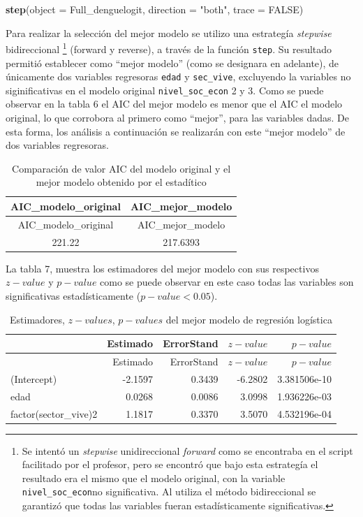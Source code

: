 \documentclass[
]{article}
\newenvironment{Shaded}{\begin{snugshade}}{\end{snugshade}}
\newcommand{\DataTypeTok}[1]{\textcolor[rgb]{0.13,0.29,0.53}{#1}}
\newcommand{\KeywordTok}[1]{\textcolor[rgb]{0.13,0.29,0.53}{\textbf{#1}}}
\newcommand{\NormalTok}[1]{#1}
\newcommand{\OtherTok}[1]{\textcolor[rgb]{0.56,0.35,0.01}{#1}}
\newcommand{\StringTok}[1]{\textcolor[rgb]{0.31,0.60,0.02}{#1}}
\begin{document}
\begin{Shaded}
\begin{Highlighting}[]
\KeywordTok{step}\NormalTok{(}\DataTypeTok{object =}\NormalTok{ Full_denguelogit, }\DataTypeTok{direction =} \StringTok{"both"}\NormalTok{, }\DataTypeTok{trace =} \OtherTok{FALSE}\NormalTok{)}
\end{Highlighting}
\end{Shaded}

Para realizar la selección del mejor modelo se utilizo una estrategía
\emph{stepwise} bidireccional \footnote{Se intentó un \emph{stepwise}
  unidireccional \emph{forward} como se encontraba en el script
  facilitado por el profesor, pero se encontró que bajo esta estrategía
  el resultado era el mismo que el modelo original, con la variable
  \texttt{nivel\_soc\_econ}no significativa. Al utiliza el método
  bidireccional se garantizó que todas las variables fueran
  estadísticamente significativas.} (forward y reverse), a través de la
función \texttt{step}. Su resultado permitió establecer como ``mejor
modelo'' (como se designara en adelante), de únicamente dos variables
regresoras \texttt{edad} y \texttt{sec\_vive}, excluyendo la variables
no siginificativas en el modelo original \texttt{nivel\_soc\_econ} 2 y
3. Como se puede observar en la tabla 6 el AIC del mejor modelo es menor
que el AIC el modelo original, lo que corrobora al primero como
``mejor'', para las variables dadas. De esta forma, los análisis a
continuación se realizarán con este ``mejor modelo'' de dos variables
regresoras.

\begin{longtable}[]{@{}cc@{}}
\caption{Comparación de valor AIC del modelo original y el mejor modelo
obtenido por el estadítico}\tabularnewline
\toprule
AIC\_modelo\_original & AIC\_mejor\_modelo\tabularnewline
\midrule
\endfirsthead
\toprule
AIC\_modelo\_original & AIC\_mejor\_modelo\tabularnewline
\midrule
\endhead
221.22 & 217.6393\tabularnewline
\bottomrule
\end{longtable}

La tabla 7, muestra los estimadores del mejor modelo con sus respectivos
\(z-value\) y \(p-value\) como se puede observar en este caso todas las
variables son significativas estadísticamente (\(p-value < 0.05\)).

\begin{longtable}[]{@{}lrrrr@{}}
\caption{Estimadores, \(z-values\), \(p-values\) del mejor modelo de
regresión logística}\tabularnewline
\toprule
& Estimado & ErrorStand & \(z-value\) & \(p-value\)\tabularnewline
\midrule
\endfirsthead
\toprule
& Estimado & ErrorStand & \(z-value\) & \(p-value\)\tabularnewline
\midrule
\endhead
(Intercept) & -2.1597 & 0.3439 & -6.2802 & 3.381506e-10\tabularnewline
edad & 0.0268 & 0.0086 & 3.0998 & 1.936226e-03\tabularnewline
factor(sector\_vive)2 & 1.1817 & 0.3370 & 3.5070 &
4.532196e-04\tabularnewline
\bottomrule
\end{longtable}
\end{document}
